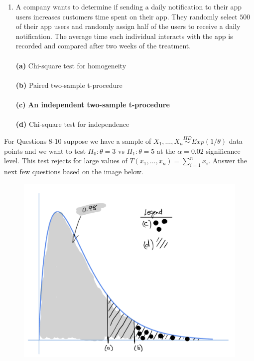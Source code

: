 \documentclass[12pt]{article}
\begin{document}
\begin{enumerate}[leftmargin=\labelsep]
\item A company wants to determine if sending a daily notification to their app users increases customers time spent on their app. They randomly select $500$ of their app users and randomly assign half of the users to receive a daily notification. The average time each individual interacts with the app is recorded and compared after two weeks of the treatment.\\
\vspace{1mm}\\
{\bf (a)} \hspace{2mm} Chi-square test for homogeneity\\ \vspace{1mm}\\
{\bf (b)} \hspace{2mm} Paired two-sample t-procedure\\   \vspace{1mm}\\
{\bf (c)} \hspace{2mm} {\bf An independent two-sample t-procedure}\\ \vspace{1mm}\\  
{\bf (d)} \hspace{2mm} Chi-square test for independence\\
\end{enumerate}



\noindent For Questions 8-10 suppose we have a sample of $X_1,\dots,X_n \stackrel{IID}{\sim} Exp(1/\theta)$ data points and we want to test $H_0: \theta=3$ vs $H_1: \theta=5$ at the $\alpha=0.02$ significance level. This test rejects for large values of $T(x_1, \dots, x_n) = \sum_{i=1}^{n}x_i$. Answer the next few questions based on the image below. 


\begin{figure}[h]
\centering
\includegraphics[width=0.7\linewidth]{Stat 61 final.png}
\end{figure}	
\end{document}
